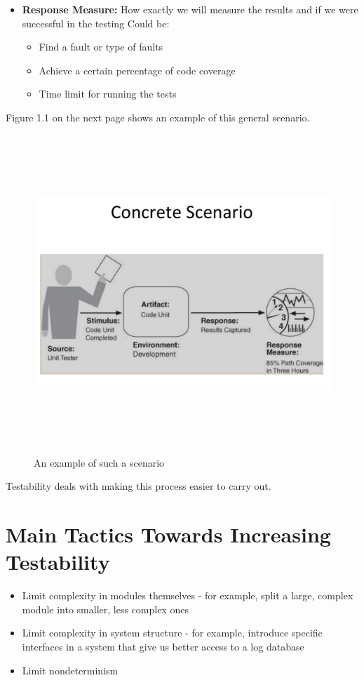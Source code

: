 \documentclass[a4paper]{report}
\begin{document}
\begin{itemize}
\item 
   \textbf{Response Measure:}
   How exactly we will measure the results and if we were successful in the testing
   Could be:
   \begin{itemize}
   \item Find a fault or type of faults
   \item Achieve a certain percentage of code coverage
   \item Time limit for running the tests
   \end{itemize} 
\end{itemize}

Figure 1.1 on the next page shows an example of this general scenario.
\begin{figure}[h]
\begin{center} 
    \includegraphics[scale=0.8,width = 15cm, height = 12cm]{images/n05at-zq1xe.pdf}
    \caption{An example of such a scenario}
\end{center}
\end{figure}

Testability deals with making this process easier to carry out.

\section{Main Tactics Towards Increasing Testability}
\begin{itemize}
\item Limit complexity in modules themselves - for example, split a large, complex module into smaller, less complex ones
\item Limit complexity in system structure - for example, introduce specific interfaces in a system that give us better access to a log database 
\item Limit nondeterminism
\end{itemize}
\end{document}

